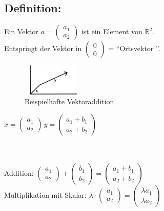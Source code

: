 %
%
%
\subsection{Definition:}
Ein Vektor $a= \begin{pmatrix} a_{1}\\  a_{2} \end{pmatrix}$ ist ein Element von $\mathbb{R}^{2}$.\\
Entspringt der Vektor in $\begin{pmatrix} 0 \\ 0 \end{pmatrix}$ = "`Ortsvektor "'.\\
\begin{figure} [H]
	\centering 
	\includegraphics[width=3cm, height=1.5cm]{mainmatter/chapter1/pics/vektor.png}
	\caption{Beispielhafte Vektoraddition} 
\end{figure}
\begin{centering}
$x = \begin{pmatrix} a_{1} \\ a_{2} \end{pmatrix} \, y=\begin{pmatrix} a_{1}+b_{1} \\ a_{2}+b_{2} \end{pmatrix}$\\
\end{centering}
\qquad\\
\qquad\\
Addition: $\begin{pmatrix}a_{1} \\ a_{2} \end{pmatrix} + \begin{pmatrix} b_{1} \\ b_{2} \end{pmatrix} = \begin{pmatrix} a_{1}+b_{1} \\ a_{2}+b_{2} \end{pmatrix} $\\
Multiplikation mit Skalar: $\lambda \cdot \begin{pmatrix} a_{1} \\ a_{2} \end{pmatrix} = \begin{pmatrix} \lambda a_{1} \\ \lambda a_{2} \end{pmatrix}$\\

